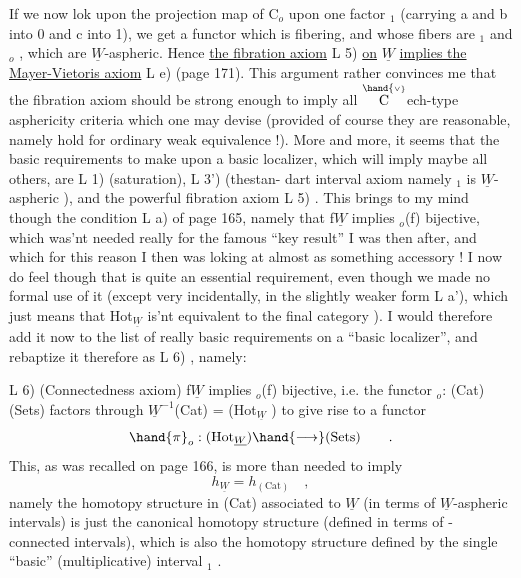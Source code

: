 
If we now lok upon the projection map of C$_o$ upon one factor \hand{$\Delta$}$_1$
(carrying a and b  into \hand{$\{$}0\hand{$\}$} and c into \hand{$\{$}1\hand{$\}$}),  we get a functor which is
fibering,  and  whose fibers are \hand{$\Delta$}$_1$ and \hand{$\Delta$}$_o$ ,  which are $\underline{W}$-aspheric.
\margin{$\times$}Hence \uline{the fibration axiom} L 5)  \uline{on} $\underline{W}$  \uline{implies the Mayer-Vietoris axiom}
L e) (page 171).   This argument rather convinces me that the fibration
axiom should be strong enough to imply all $\overset{\hand{\scriptscriptstyle\vee}}{\mathrm C}$ech-type asphericity criteria
which one may devise (provided of course they are reasonable,  namely
hold for ordinary weak equivalence !).   More and more,  it seems that
the basic requirements to make upon a  basic localizer,  which
will imply maybe all others,  are L 1) (saturation),  L 3')  (thestan-%
dart interval axiom namely  \hand{$\Delta$}$_1$  is $\underline{W}$-aspheric ),  and the powerful
fibration axiom L 5) .  This brings to my mind though the condition L a)
of page 165,  namely that  f\hand{$\in$}$\underline{W}$  implies  \hand{$\pi$}$_o$(f)  bijective,  which was'nt
needed really for the famous ``key result'' I was then after,  and which
for this reason I then was loking at almost as something accessory !
I now do feel though that is quite an essential requirement,  even though
we made no formal use of it  (except very incidentally,  in the slightly
weaker form  L a'),  which just means that Hot$_{\underline{W}}$ is'nt equivalent to the
final category ).   I would therefore add it now to the list of really
basic requirements on a ``basic localizer'',  and rebaptize it therefore
as  L 6) ,  namely:

L 6)  (Connectedness axiom)  f\hand{$\in$}$\underline{W}$  implies  \hand{$\pi$}$_o$(f)  bijective,  i.e.
the functor  \hand{$\pi$}$_o$: (Cat)\hand{$\rightarrow$}(Sets)  factors through  $\underline{W}^{-1}$(Cat)  =
(Hot$_{\underline{W}}$ )  to give rise to a functor
\[ \hand{\ensuremath{\pi}}_o : (\mathrm{Hot}_{\underline{W}}) \hand{\ensuremath{\longrightarrow}} (\mathrm{Sets}) \qquad . \]
This,   as was recalled on page 166,  is more than needed to imply
\[ h_{\underline{W}} = h_{(\mathrm{Cat})} \quad , \]
namely the homotopy structure in (Cat)  associated to $\underline{W}$  (in terms of
$\underline{W}$-aspheric intervals)  is just the canonical homotopy structure (defined
in terms of -connected intervals),  which is also the homotopy structure
defined by the single ``basic'' (multiplicative) interval \hand{$\Delta$}$_1$ .

